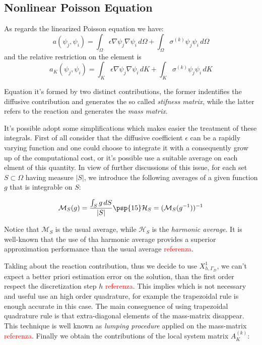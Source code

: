 \subsection{Nonlinear Poisson Equation}


As regards the linearized Poisson equation we have:
\begin{equation}
a(\psi_j,\psi_i)  = \int_{\Omega} \epsilon \nabla \psi_j \nabla \psi_i \, d\Omega + \int_{\Omega} \sigma^{(k)}\psi_j \psi_i \, d\Omega 
\end{equation}
and the relative restriction on the element is
\begin{equation}
\label{eq: bilinear local discrete}
a_K(\psi_j,\psi_i)  = \int_{K} \epsilon \nabla \psi_j \nabla \psi_i \, dK + \int_{K} \sigma^{(k)}\psi_j \psi_i \, dK
\end{equation}

Equation  it's formed by two distinct contributions, the former indentifies the diffusive contribution and generates the so called \textit{stifness matrix}, while the latter refers to the reaction and generates the \textit{mass matrix}.


It's possible adopt some simplifications which makes easier the treatment of these integrals. First of all consider that the diffusive coefficient $\epsilon$ can be a rapidly varying function and one could choose to integrate it with a consequently grow up of the computational cost, or it's possible use a suitable average on each elment of this quantity. In view of further discussions of this issue, for each set $S \subset \Omega$ having measure $|S|$, we introduce the following averages of a given function $g$ that is integrable on $S$:

\begin{equation*}
\mathcal{M}_S(g) = \dfrac{\int_S g \, dS}{|S|} \psp{15} \mathcal{H}_S = (\mathcal{M}_S(g^{-1}))^{-1} 
\end{equation*}

Notice that $\mathcal{M}_S$ is the usual average, while $\mathcal{H}_S$ is the \textit{harmonic average}. It is well-known that the use of tha harmonic average provides a superior approximation performance than the usual average \textcolor{red}{referenza}.

Takling about the reaction contribution, thus we decide to use $X^1_{h,\Gamma_D}$,  we can't expect a better priori estimation error on the solution, than the first order respect the discretization step $h$ \textcolor{red}{referenza}. This implies which is not necessary and useful use an high order quadrature, for example the trapezoidal rule is enough accurate in this case. 
The main conseguence of using trapezoidal quadrature rule is that extra-diagonal elements of the mass-matrix disappear.
This technique is well known as \textit{lumping procedure} applied on the mass-matrix \textcolor{red}{referenza}.
Finally we obtain the contributions of the local system matrix $A_K^{(k)}$:

